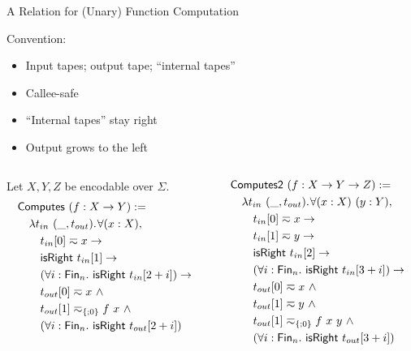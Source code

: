 \documentclass{beamer} %
\begin{document}
\begin{frame}[fragile]{A Relation for (Unary) Function Computation}

  Convention:
  \begin{itemize}
  \item Input tapes; output tape; ``internal tapes''
  \item Callee-safe
  \item ``Internal tapes'' stay right
  \item Output grows to the left
  \end{itemize}
  \pause
  { \footnotesize
    \begin{columns}
      \begin{column}{0.5\textwidth}
        Let $X, Y, Z$ be encodable over $\Sigma$.
        \begin{alignat*}{2}
          & \MS{Computes}~(f:X \to Y) := \\
          & \quad \lam {t_{in}~(\_, t_{out})} \forall (x:X), \\
          & \quad\quad t_{in}[0] \eqsim x \rightarrow \\
          & \quad\quad \MS{isRight}~t_{in}[1] \rightarrow \\
          & \quad\quad (\forall i : \Fin_n.~\MS{isRight}~t_{in}[2+i]) \rightarrow \\
          & \quad\quad t_{out}[0] \eqsim x ~\land \\
          & \quad\quad t_{out}[1] \eqsim_{\{;0\}} f~x ~\land \\
          & \quad\quad (\forall i : \Fin_n.~\MS{isRight}~t_{out}[2+i])
        \end{alignat*}
      \end{column}
      \pause
      \begin{column}{0.5\textwidth}
        \begin{alignat*}{2}
          & \MS{Computes2}~(f:X \to Y \to Z) := \\
          & \quad \lam {t_{in}~(\_, t_{out})} \forall (x:X)~(y:Y), \\
          & \quad\quad t_{in}[0] \eqsim x \rightarrow \\
          & \quad\quad t_{in}[1] \eqsim y \rightarrow \\
          & \quad\quad \MS{isRight}~t_{in}[2] \rightarrow \\
          & \quad\quad (\forall i : \Fin_n.~\MS{isRight}~t_{in}[3+i]) \rightarrow \\
          & \quad\quad t_{out}[0] \eqsim x ~\land \\
          & \quad\quad t_{out}[1] \eqsim y ~\land \\
          & \quad\quad t_{out}[1] \eqsim_{\{;0\}} f~x~y ~\land \\
          & \quad\quad (\forall i : \Fin_n.~\MS{isRight}~t_{out}[3+i])
        \end{alignat*}
      \end{column}
    \end{columns}
  }
\end{frame}
\end{document}
